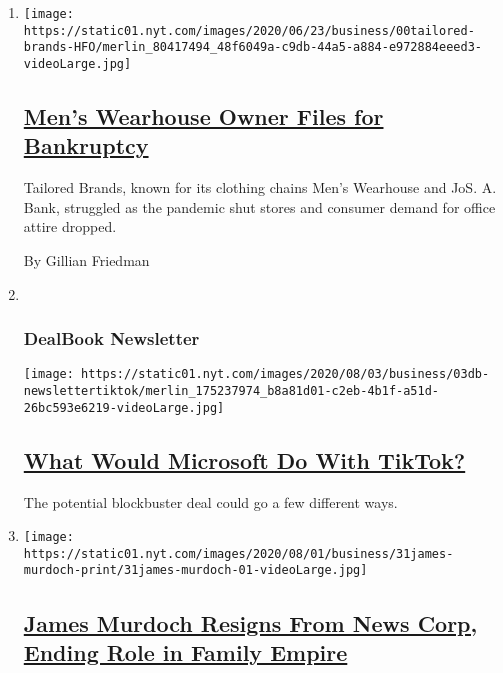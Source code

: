 \begin{enumerate}
\def\labelenumi{\arabic{enumi}.}
\item
  \texttt{[image: https://static01.nyt.com/images/2020/06/23/business/00tailored-brands-HFO/merlin\_80417494\_48f6049a-c9db-44a5-a884-e972884eeed3-videoLarge.jpg]}

  \hypertarget{mens-wearhouse-owner-files-for-bankruptcy}{%
  \subsection{\texorpdfstring{\href{/2020/08/03/business/tailored-brands-mens-wearhouse-bankruptcy.html}{Men's
  Wearhouse Owner Files for
  Bankruptcy}}{Men's Wearhouse Owner Files for Bankruptcy}}\label{mens-wearhouse-owner-files-for-bankruptcy}}

  Tailored Brands, known for its clothing chains Men's Wearhouse and
  JoS. A. Bank, struggled as the pandemic shut stores and consumer
  demand for office attire dropped.

  By Gillian Friedman
\item ~
  \hypertarget{dealbook-newsletter}{%
  \subsubsection{DealBook Newsletter}\label{dealbook-newsletter}}

  \texttt{[image: https://static01.nyt.com/images/2020/08/03/business/03db-newslettertiktok/merlin\_175237974\_b8a81d01-c2eb-4b1f-a51d-26bc593e6219-videoLarge.jpg]}

  \hypertarget{what-would-microsoft-do-with-tiktok}{%
  \subsection{\texorpdfstring{\href{/2020/08/03/business/dealbook/tiktok-microsoft-takeover.html}{What
  Would Microsoft Do With
  TikTok?}}{What Would Microsoft Do With TikTok?}}\label{what-would-microsoft-do-with-tiktok}}

  The potential blockbuster deal could go a few different ways.
\item
  \texttt{[image: https://static01.nyt.com/images/2020/08/01/business/31james-murdoch-print/31james-murdoch-01-videoLarge.jpg]}

  \hypertarget{james-murdoch-resigns-from-news-corp-ending-role-in-family-empire}{%
  \subsection{\texorpdfstring{\href{/2020/07/31/business/media/james-murdoch-resigns-news-corp.html}{James
  Murdoch Resigns From News Corp, Ending Role in Family
  Empire}}{James Murdoch Resigns From News Corp, Ending Role in Family Empire}}\label{james-murdoch-resigns-from-news-corp-ending-role-in-family-empire}}


\end{enumerate}
